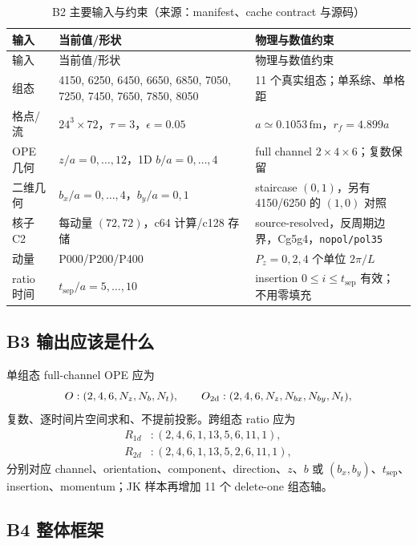 \documentclass[UTF8]{ctexart}
\newcommand{\Pz}{P_z}
\newcommand{\ts}{t_{\mathrm{sep}}}
\begin{document}
\begin{xltabular}{\textwidth}{@{}p{0.25\textwidth}p{0.25\textwidth}X@{}}
\caption{B2 主要输入与约束（来源：manifest、cache contract 与源码）}\\
\toprule
输入 & 当前值/形状 & 物理与数值约束 \\
\midrule
\endfirsthead
\toprule
输入 & 当前值/形状 & 物理与数值约束 \\
\midrule
\endhead
组态 & 4150, 6250, 6450, 6650, 6850, 7050, 7250, 7450, 7650, 7850, 8050 & 11 个真实组态；单系综、单格距 \\
格点/流 & \(24^3\times72\)，\(\tau=3\)，\(\epsilon=0.05\) & \(a\simeq0.1053\,\mathrm{fm}\)，\(r_f=4.899a\) \\
OPE 几何 & \(z/a=0,\ldots,12\)，1D \(b/a=0,\ldots,4\) & full channel \(2\times4\times6\)；复数保留 \\
二维几何 & \(b_x/a=0,\ldots,4\)，\(b_y/a=0,1\) & staircase \((0,1)\)，另有 4150/6250 的 \((1,0)\) 对照 \\
核子 C2 & 每动量 \((72,72)\)，c64 计算/c128 存储 & source-resolved，反周期边界，Cg5g4，\texttt{nopol/pol35} \\
动量 & P000/P200/P400 & \(\Pz=0,2,4\) 个单位 \(2\pi/L\) \\
ratio 时间 & \(\ts/a=5,\ldots,10\) & insertion \(0\le i\le\ts\) 有效；不用零填充 \\
\bottomrule
\end{xltabular}

\subsection{B3 输出应该是什么}

单组态 full-channel OPE 应为
\begin{equation}
O:(2,4,6,N_z,N_b,N_t),
\qquad
O_{\rm 2d}:(2,4,6,N_z,N_{bx},N_{by},N_t),
\label{eq:ope-shapes}
\end{equation}
复数、逐时间片空间求和、不提前投影。跨组态 ratio 应为
\begin{align}
R_{1d}&:(2,4,6,1,13,5,6,11,1),\\
R_{2d}&:(2,4,6,1,13,5,2,6,11,1),
\label{eq:ratio-shapes}
\end{align}
分别对应 channel、orientation、component、direction、\(z\)、\(b\) 或
\((b_x,b_y)\)、\(\ts\)、insertion、momentum；JK 样本再增加 11 个 delete-one 组态轴。

\subsection{B4 整体框架}
\end{document}
